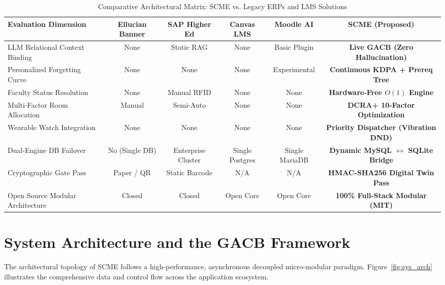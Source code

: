 \documentclass[11pt,a4paper]{article}
\begin{document}
\begin{table}[t]
\centering
\caption{Comparative Architectural Matrix: SCME vs. Legacy ERPs and LMS Solutions}
\label{tab:lit_comparison}
\small
\begin{tabularx}{\textwidth}{lccccc}
\toprule
\textbf{Evaluation Dimension} & \textbf{Ellucian Banner} & \textbf{SAP Higher Ed} & \textbf{Canvas LMS} & \textbf{Moodle AI} & \textbf{SCME (Proposed)} \\
\midrule
LLM Relational Context Binding & None & Static RAG & None & Basic Plugin & \textbf{Live GACB (Zero Hallucination)} \\
Personalized Forgetting Curve & None & None & None & Experimental & \textbf{Continuous KDPA + Prereq Tree} \\
Faculty Status Resolution & None & Manual RFID & None & None & \textbf{Hardware-Free $O(1)$ Engine} \\
Multi-Factor Room Allocation & Manual & Semi-Auto & None & None & \textbf{DCRA+ 10-Factor Optimization} \\
Wearable Watch Integration & None & None & None & None & \textbf{Priority Dispatcher (Vibration DND)} \\
Dual-Engine DB Failover & No (Single DB) & Enterprise Cluster & Single Postgres & Single MariaDB & \textbf{Dynamic MySQL $\leftrightarrow$ SQLite Bridge} \\
Cryptographic Gate Pass & Paper / QR & Static Barcode & N/A & N/A & \textbf{HMAC-SHA256 Digital Twin Pass} \\
Open Source Modular Architecture & Closed & Closed & Open Core & Open Core & \textbf{100\% Full-Stack Modular (MIT)} \\
\bottomrule
\end{tabularx}
\end{table}

\section{System Architecture and the GACB Framework}
\label{sec:architecture}

The architectural topology of SCME follows a high-performance, asynchronous decoupled micro-modular paradigm. Figure~\ref{fig:sys_arch} illustrates the comprehensive data and control flow across the application ecosystem.
\end{document}
